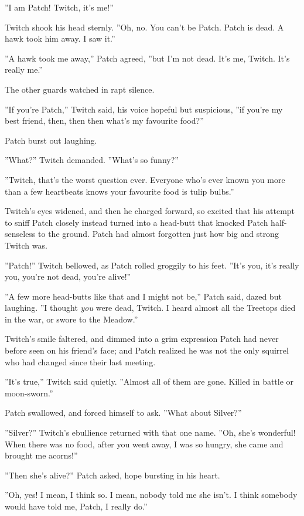 \documentclass[12pt]{book}
\begin{document}
''I am Patch! Twitch, it's me!''

Twitch shook his head sternly. ''Oh, no. You can't be Patch. Patch is dead. A hawk took him away. I saw it.''

''A hawk took me away,'' Patch agreed, ''but I'm not dead. It's me, Twitch. It's really me.''

The other guards watched in rapt silence.

''If you're Patch,'' Twitch said, his voice hopeful but suspicious, ''if you're my best friend, then, then %
then what's my favourite food?''

Patch burst out laughing.

''What?'' Twitch demanded. ''What's so funny?''

''Twitch, that's the worst question ever. Everyone who's ever known you more than a few heartbeats knows your favourite food is tulip bulbs.''

Twitch's eyes widened, and then he charged forward, so excited that his attempt to sniff Patch closely instead turned into a head-butt that knocked Patch half-senseless to the ground. Patch had almost forgotten just how big and strong Twitch was.

''Patch!'' Twitch bellowed, as Patch rolled groggily to his feet. ''It's you, it's really you, you're not dead, you're alive!''

''A few more head-butts like that and I might not be,'' Patch said, dazed but laughing. ''I thought {\it you} were dead, Twitch. I heard almost all the Treetops died in the war, or swore to the Meadow.''

Twitch's smile faltered, and dimmed into a grim expression Patch had never before seen on his friend's face; and Patch realized he was not the only squirrel who had changed since their last meeting.

''It's true,'' Twitch said quietly. ''Almost all of them are gone. Killed in battle or moon-sworn.''

Patch swallowed, and forced himself to ask. ''What about Silver?''

''Silver?'' Twitch's ebullience returned with that one name. ''Oh, she's wonderful! When there was no food, after you went away, I was so hungry, she came and brought me acorns!''

''Then she's alive?'' Patch asked, hope bursting in his heart.

''Oh, yes! I mean, I think so. I mean, nobody told me she isn't. I think somebody would have told me, Patch, I really do.''
\end{document}
